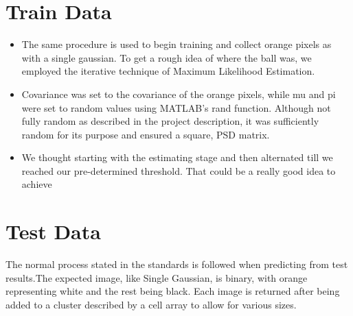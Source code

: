 \documentclass{article}
\begin{document}
\section{Train Data }
    \begin{itemize}
        \item The same procedure is used to begin training and collect orange pixels as with a single gaussian. To get a rough idea of where the ball was, we employed the iterative technique of Maximum Likelihood Estimation. 
        \item Covariance was set to the covariance of the orange pixels, while mu and pi were set to random values using MATLAB's rand function. Although not fully random as described in the project description, it was sufficiently random for its purpose and ensured a square, PSD matrix. 
        \item We thought starting with the estimating stage and then alternated till we reached our pre-determined threshold. That could be a really good idea to achieve
    \end{itemize}
\section{Test Data}
    \item The normal process stated in the standards is followed when predicting from test results.The expected image, like Single Gaussian, is binary, with orange representing white and the rest being black. Each image is returned after being added to a cluster described by a cell array to allow for various sizes.
\end{document}
